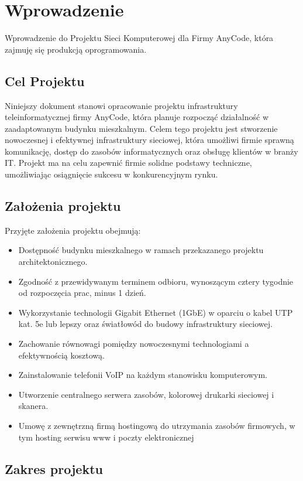 
\section{Wprowadzenie}
Wprowadzenie do Projektu Sieci Komputerowej dla Firmy AnyCode, która zajmuję się produkcją oprogramowania.

\subsection{Cel Projektu}
Niniejszy dokument stanowi opracowanie projektu infrastruktury teleinformatycznej firmy AnyCode, która planuje rozpocząć działalność w zaadaptowanym budynku mieszkalnym. Celem tego projektu jest stworzenie nowoczesnej i efektywnej infrastruktury sieciowej, która umożliwi firmie sprawną komunikację, dostęp do zasobów informatycznych oraz obsługę klientów w branży IT. Projekt ma na celu zapewnić firmie solidne podstawy techniczne, umożliwiając osiągnięcie sukcesu w konkurencyjnym rynku.

\subsection{Założenia projektu}
Przyjęte założenia projektu obejmują:
\begin{itemize}
    \item Dostępność budynku mieszkalnego w ramach przekazanego projektu architektonicznego.
    \item Zgodność z przewidywanym terminem odbioru, wynoszącym cztery tygodnie od rozpoczęcia prac, minus 1 dzień.
    \item Wykorzystanie technologii Gigabit Ethernet (1GbE) w oparciu o kabel UTP kat. 5e lub lepszy oraz światłowód do budowy infrastruktury sieciowej.
    \item Zachowanie równowagi pomiędzy nowoczesnymi technologiami a efektywnością kosztową.
    \item Zainstalowanie telefonii VoIP na każdym stanowisku komputerowym.
    \item Utworzenie centralnego serwera zasobów, kolorowej drukarki sieciowej i skanera.
    \item Umowę z zewnętrzną firmą hostingową do utrzymania zasobów firmowych, w tym hosting serwisu www i poczty elektronicznej   
\end{itemize}

\subsection{Zakres projektu}

